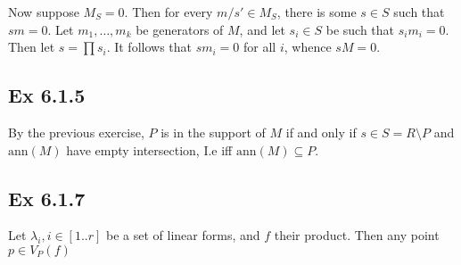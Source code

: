 \documentclass{article}
\theoremstyle{definition}
\newcommand{\ann}{\text{ann}}
\begin{document}
Now suppose $M_S = 0$. Then for every $m/s' \in M_S$, there is some $s \in S$
such that $sm = 0$. Let $m_1, \ldots, m_k$ be generators of $M$, and let $s_i
\in S$ be such that $s_i m_i = 0$. Then let $s = \prod s_i$. It follows that
$sm_i = 0$ for all $i$, whence $sM = 0$.

\subsection*{Ex 6.1.5}

By the previous exercise, $P$ is in the support of $M$ if and only if $s \in S
= R \setminus P$ and $\ann(M)$ have empty intersection, I.e iff $\ann(M)
\subseteq P$.

\subsection*{Ex 6.1.7}

Let $\lambda_i, i \in [1..r]$ be a set of linear forms, and $f$ their product. 
Then any point $p \in V_P(f)$ 
\end{document}
